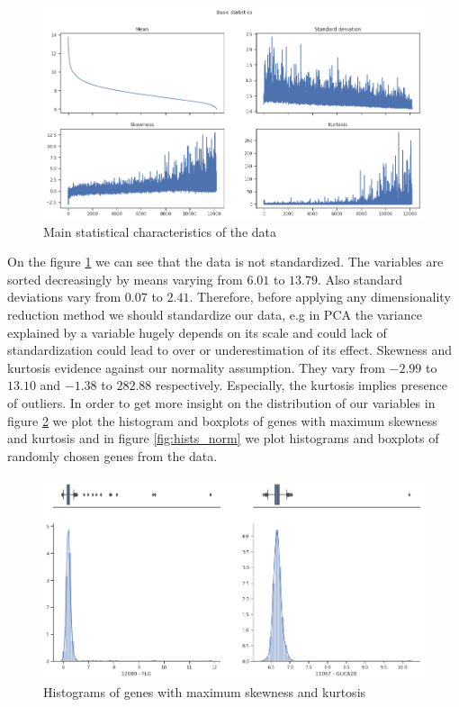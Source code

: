 \documentclass[12pt, wide]{mwart}
\begin{document}
\begin{figure}
\centering
\includegraphics[width=\textwidth]{images/basic_stats.png}
\caption{Main statistical characteristics of the data}
\label{fig:stats}
\end{figure}

On the figure \ref{fig:stats} we can see that the data is not standardized. The variables are sorted decreasingly by means varying from $6.01$ to $13.79$. Also standard deviations vary from $0.07$ to $2.41$. Therefore, before applying any dimensionality reduction method we should standardize our data, e.g in PCA the variance explained by a variable hugely depends on its scale and could lack of standardization could lead to over or underestimation of its effect. Skewness and kurtosis evidence against our normality assumption. They vary from $-2.99$ to $13.10$ and $-1.38$ to $282.88$ respectively. Especially, the kurtosis implies presence of outliers. In order to get more insight on the distribution of our variables in figure \ref{fig:hists_out} we plot the histogram and boxplots of genes with maximum skewness and kurtosis and in figure \ref{fig:hists_norm} we plot histograms and boxplots of randomly chosen genes from the data. 

\begin{figure}
\centering
\includegraphics[width=\textwidth]{images/hists_ouliers.png}
\caption{Histograms of genes with maximum skewness and kurtosis}
\label{fig:hists_out}
\end{figure}
\end{document}
